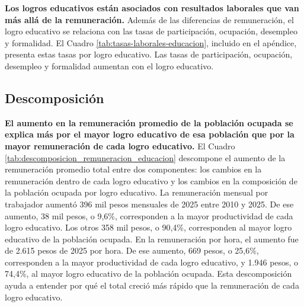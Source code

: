 \textbf{Los logros educativos están asociados con resultados laborales que van más allá de la remuneración.} Además de las diferencias de remuneración, el logro educativo se relaciona con las tasas de participación, ocupación, desempleo y formalidad. El Cuadro \ref{tab:tasas-laborales-educacion}, incluido en el apéndice, presenta estas tasas por logro educativo. Las tasas de participación, ocupación, desempleo y formalidad aumentan con el logro educativo.



\subsection{Descomposición}



\textbf{El aumento en la remuneración promedio de la población ocupada se explica más por el mayor logro educativo de esa población que por la mayor remuneración de cada logro educativo.} El Cuadro \ref{tab:descomposicion_remuneracion_educacion} descompone el aumento de la remuneración promedio total entre dos componentes: los cambios en la remuneración dentro de cada logro educativo y los cambios en la composición de la población ocupada por logro educativo. La remuneración mensual por trabajador aumentó 396 mil pesos mensuales de 2025 entre 2010 y 2025. De ese aumento, 38 mil pesos, o 9,6\%, corresponden a la mayor productividad de cada logro educativo. Los otros 358 mil pesos, o 90,4\%, corresponden al mayor logro educativo de la población ocupada. En la remuneración por hora, el aumento fue de 2.615 pesos de 2025 por hora. De ese aumento, 669 pesos, o 25,6\%, corresponden a la mayor productividad de cada logro educativo, y 1.946 pesos, o 74,4\%, al mayor logro educativo de la población ocupada. Esta descomposición ayuda a entender por qué el total creció más rápido que la remuneración de cada logro educativo.

